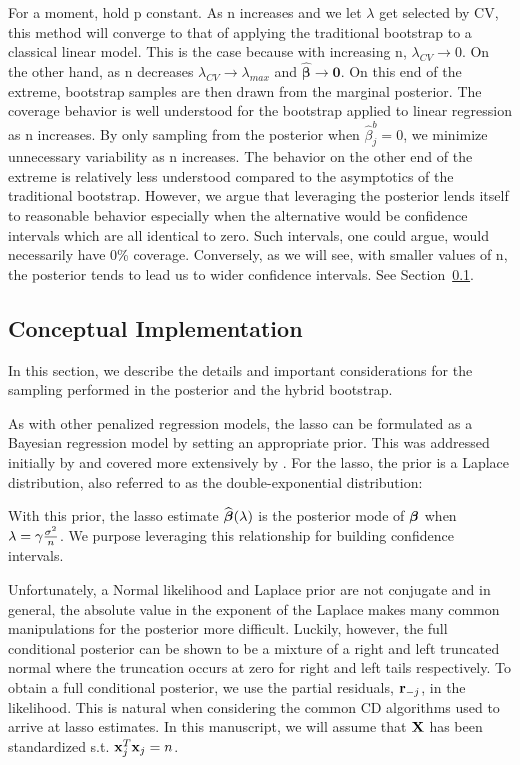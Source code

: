 For a moment, hold p constant. As n increases and we let $\lambda$ get selected by CV, this method will converge to that of applying the traditional bootstrap to a classical linear model. This is the case because with increasing n, $\lambda_{CV} \rightarrow 0$. On the other hand, as n decreases $\lambda_{CV} \rightarrow \lambda_{max}$ and $\hat{\boldsymbol{\beta}}\rightarrow \boldsymbol{0}$. On this end of the extreme, bootstrap samples are then drawn from the marginal posterior. The coverage behavior is well understood for the bootstrap applied to linear regression as n increases. By only sampling from the posterior when $\hat{\beta}_j^b = 0$, we minimize unnecessary variability as n increases. The behavior on the other end of the extreme is relatively less understood compared to the asymptotics of the traditional bootstrap. However, we argue that leveraging the posterior lends itself to reasonable behavior especially when the alternative would be confidence intervals which are all identical to zero. Such intervals, one could argue, would necessarily have 0\% coverage. Conversely, as we will see, with smaller values of n, the posterior tends to lead us to wider confidence intervals. See Section~\ref{Sec:full-cond}.

\subsection{Conceptual Implementation}
\label{Sec:full-cond}

In this section, we describe the details and important considerations for the sampling performed in the posterior and the hybrid bootstrap.

As with other penalized regression models, the lasso can be formulated as a Bayesian regression model by setting an appropriate prior. This was addressed initially by \cite{Tibshirani1996} and covered more extensively by \cite{Park2008}. For the lasso, the prior is a Laplace distribution, also referred to as the double-exponential distribution:


With this prior, the lasso estimate $\widehat{\boldsymbol{\beta}}(\lambda)$ is the posterior mode of $\boldsymbol{\beta}$ when $\lambda = \gamma \frac{\sigma^2}{n}$. We purpose leveraging this relationship for building confidence intervals.

Unfortunately, a Normal likelihood and Laplace prior are not conjugate and in general, the absolute value in the exponent of the Laplace makes many common manipulations for the posterior more difficult. Luckily, however, the full conditional posterior can be shown to be a mixture of a right and left truncated normal where the truncation occurs at zero for right and left tails respectively. To obtain a full conditional posterior, we use the partial residuals, $\mathbf{r}_{-j}$, in the likelihood. This is natural when considering the common CD algorithms used to arrive at lasso estimates. In this manuscript, we will assume that $\mathbf{X}$ has been standardized s.t. $\mathbf{x}_j^T\mathbf{x}_j = n$.

